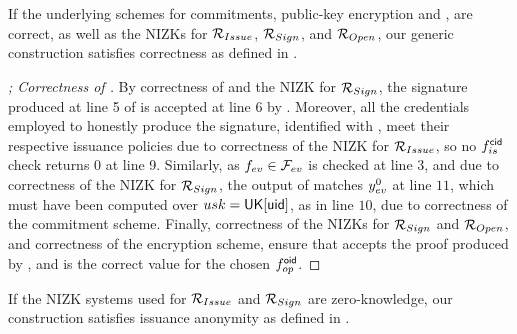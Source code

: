 \begin{theorem}
  \label{thm:correctness-uas}
  If the underlying schemes for commitments, public-key encryption and \SBCM,
  are correct,
  as well as the NIZKs for $\mathcal{R}_{Issue}$, $\mathcal{R}_{Sign}$, and
  $\mathcal{R}_{Open}$, our generic construction \CUASGen satisfies correctness as
  defined in .
\end{theorem}

\begin{proof}[; Correctness of \CUASGen]
  By correctness of \SBCM and the NIZK for $\mathcal{R}_{Sign}$, the signature
  produced at line 5 of \ExpCorrect is accepted at line 6 by \Verify.
  Moreover, all the credentials employed to honestly produce the signature,
  identified with \scid, meet their respective issuance policies due to
  correctness of the NIZK for $\mathcal{R}_{Issue}$, so no $f_{is}^\mathsf{cid}$ check
  returns $0$ at line 9. Similarly, as $f_{ev} \in \mathcal{F}_{ev}$ is checked at
  line 3, and due to correctness of the NIZK for $\mathcal{R}_{Sign}$, the
  output of \feval matches $y_{ev}^0$ at line $11$, which must have been
  computed over $usk=\mathsf{UK}[\mathsf{uid}]$, as in line $10$, due to correctness of the
  commitment scheme. Finally, correctness of the NIZKs for $\mathcal{R}_{Sign}$
  and $\mathcal{R}_{Open}$, and correctness of the encryption scheme, ensure that
  \Judge accepts the proof produced by \Open, and \yinsp is the correct value
  for the chosen $f_{op}^{\mathsf{oid}}$.
\end{proof}

\begin{theorem}
  \label{thm:issue-anonymity-uas}
  If the NIZK systems used for $\mathcal{R}_{Issue}$ and $\mathcal{R}_{Sign}$ are
  zero-knowledge, our \CUASGen construction satisfies issuance anonymity as
  defined in .
\end{theorem}

